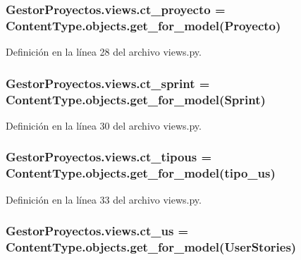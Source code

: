 \subsubsection[{\texorpdfstring{ct\+\_\+proyecto}{ct_proyecto}}]{\setlength{\rightskip}{0pt plus 5cm}Gestor\+Proyectos.\+views.\+ct\+\_\+proyecto = Content\+Type.\+objects.\+get\+\_\+for\+\_\+model({\bf Proyecto})}\hypertarget{namespace_gestor_proyectos_1_1views_af508953d6cab04a66a55b64c9e0022a8}{}\label{namespace_gestor_proyectos_1_1views_af508953d6cab04a66a55b64c9e0022a8}


Definición en la línea 28 del archivo views.\+py.

\subsubsection[{\texorpdfstring{ct\+\_\+sprint}{ct_sprint}}]{\setlength{\rightskip}{0pt plus 5cm}Gestor\+Proyectos.\+views.\+ct\+\_\+sprint = Content\+Type.\+objects.\+get\+\_\+for\+\_\+model({\bf Sprint})}\hypertarget{namespace_gestor_proyectos_1_1views_a438baac3ef8df3babde463cbefa88937}{}\label{namespace_gestor_proyectos_1_1views_a438baac3ef8df3babde463cbefa88937}


Definición en la línea 30 del archivo views.\+py.

\subsubsection[{\texorpdfstring{ct\+\_\+tipous}{ct_tipous}}]{\setlength{\rightskip}{0pt plus 5cm}Gestor\+Proyectos.\+views.\+ct\+\_\+tipous = Content\+Type.\+objects.\+get\+\_\+for\+\_\+model({\bf tipo\+\_\+us})}\hypertarget{namespace_gestor_proyectos_1_1views_a6e6e3b36c240ecc57c6ed4c9746894c0}{}\label{namespace_gestor_proyectos_1_1views_a6e6e3b36c240ecc57c6ed4c9746894c0}


Definición en la línea 33 del archivo views.\+py.

\subsubsection[{\texorpdfstring{ct\+\_\+us}{ct_us}}]{\setlength{\rightskip}{0pt plus 5cm}Gestor\+Proyectos.\+views.\+ct\+\_\+us = Content\+Type.\+objects.\+get\+\_\+for\+\_\+model({\bf User\+Stories})}\hypertarget{namespace_gestor_proyectos_1_1views_a11bb41776e22ba3be21c89ced5ccbc9a}{}\label{namespace_gestor_proyectos_1_1views_a11bb41776e22ba3be21c89ced5ccbc9a}


